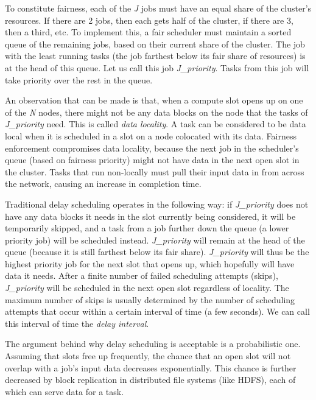 \documentclass[10pt,conference,compsocconf,letterpaper]{IEEEtran}
\begin{document}
To constitute fairness, each of the \textit{J} jobs must have an equal share of the 
cluster's resources. If there are 2 jobs, then each gets half of the cluster, if there 
are 3, then a third, etc. To implement this, a fair scheduler must maintain a sorted 
queue of the remaining jobs, based on their current share of the cluster. The job with 
the least running tasks (the job farthest below its fair share of resources) is at the 
head of this queue. Let us call this job \textit{J\_priority}. Tasks from this job will 
take priority over the rest in the queue.
   
An observation that can be made is that, when a compute slot opens up on one of the 
\textit{N} nodes, there might not be any data blocks on the node that the tasks of 
\textit{J\_priority} need. This is called \textit{data locality}. A task can 
be considered to be data local when it is scheduled in a slot on a node colocated with its
data. Fairness enforcement compromises data locality, because the next job in the 
scheduler's queue (based on fairness priority) might not have data in the next open slot 
in the cluster. Tasks that run non-locally must pull their input data in from across the 
network, causing an increase in completion time.

Traditional delay scheduling operates in the following way: if 
\textit{J\_priority} does not have any data blocks it needs in the slot currently being 
considered, it will be temporarily skipped, and a task from a job further down the queue 
(a lower priority job) will be scheduled instead. \textit{J\_priority} will remain at the 
head of the queue (because it is still farthest below its fair share). 
\textit{J\_priority} will thus be the highest priority job for the next slot that opens 
up, which hopefully will have data it needs. After a finite number of failed scheduling 
attempts (skips), \textit{J\_priority} will be scheduled in the next open slot regardless 
of locality. The maximum number of skips is usually determined by the number of scheduling
attempts that occur within a certain interval of time (a few seconds). We can call this
interval of time the \textit{delay interval}.

The argument behind why delay scheduling is acceptable is a probabilistic one. Assuming 
that slots free up frequently, the chance that an open slot will not overlap with a job's 
input data decreases exponentially. This chance is further decreased by block replication 
in distributed file systems (like HDFS), each of which can serve data for a task.
\end{document}

